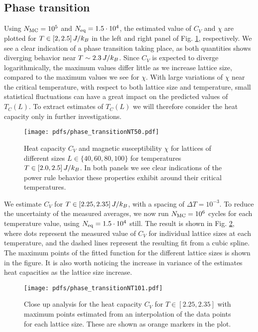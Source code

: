 \subsection{Phase transition}\label{subsec_results:phase_transition}
Using $N_\mathrm{MC}=10^5$ and $N_\mathrm{eq}=1.5\cdot10^4$, the estimated value of $C_V$ and $\chi$ are plotted for $T\in[2,2.5]\,J/k_B$ in the left and right panel of Fig. \ref{fig:phase_transition}, respectively. We see a clear indication of a phase transition taking place, as both quantities shows diverging behavior near $T\sim2.3\,J/k_B$. Since $C_V$ is expected to diverge logarithmically, the maximum values differ little as we increase lattice size, compared to the maximum values we see for $\chi$. With large variations of $\chi$ near the critical temperature, with respect to both lattice size and temperature, small statistical fluctuations can have a great impact on the predicted values of $T_C(L)$. To extract estimates of $T_C(L)$ we will therefore consider the heat capacity only in further investigations. 
\begin{figure*}[!ht]
    \texttt{[image: pdfs/phase\_transitionNT50.pdf]} 
    \caption{Heat capacity $C_V$ and magnetic susceptibility $\chi$ for lattices of different sizes $L\in\{40,60,80,100\}$ for temperatures $T\in[2.0,2.5]\,J/k_B$. In both panels we see clear indications of the power rule behavior these properties exhibit around their critical temperatures.}
    \label{fig:phase_transition}
\end{figure*} 

We estimate $C_V$ for $T\in[2.25,2.35]\,J/k_B$, with a spacing of $\Delta T=10^{-3}$. To reduce the uncertainty of the measured averages, we now run $N_\mathrm{MC}=10^6$ cycles for each temperature value, using $N_\mathrm{eq}=1.5\cdot10^4$ still. The result is shown in Fig. \ref{fig:phase_transition_zoomed}, where dots represent the measured value of $C_V$ for individual lattice sizes at each temperature, and the dashed lines represent the resulting fit from a cubic spline. The maximum points of the fitted function for the different lattice sizes is shown in the figure. It is also worth noticing the increase in variance of the estimates heat capacities as the lattice size increase.
\begin{figure}[!ht]
    \texttt{[image: pdfs/phase\_transitionNT101.pdf]} 
    \caption{Close up analysis for the heat capacity $C_V$ for $T\in[2.25, 2.35]$ with maximum points estimated from an interpolation of the data points for each lattice size. These are shown as orange markers in the plot.}
    \label{fig:phase_transition_zoomed}
\end{figure} 

